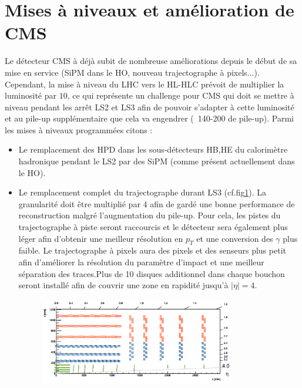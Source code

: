 \section{Mises à niveaux et amélioration de CMS}
Le détecteur CMS à déjà subit de nombreuse améliorations depuis le début de sa mise en service (SiPM dans le HO, nouveau trajectographe à pixels...). Cependant, la mise à niveau du LHC vers le HL-HLC prévoit de multiplier la luminosité par $10$, ce qui représente un challenge pour CMS qui doit se mettre à niveau pendant les arrêt LS2 et LS3 afin de pouvoir s'adapter à cette luminosité et au pile-up supplémentaire que cela va engendrer (~140-200 de pile-up). Parmi les mises à niveaux programmées citons \cite{Collaboration:1355706} \cite{Contardo:2020886} :
\begin{itemize}[label=$\bullet$]
	\item Le remplacement des HPD dans les sous-détecteurs HB,HE du calorimètre hadronique pendant le LS2 par des SiPM (comme présent actuellement dans le HO).
	\item Le remplacement complet du trajectographe durant LS3 (cf.fig\ref{tracker2}). La granularité doit être multiplié par 4 afin de gardé une bonne performance de reconstruction malgré l'augmentation du pile-up. Pour cela, les pistes du trajectographe à piste seront raccourcis et le détecteur sera également plus léger afin d'obtenir une meilleur résolution en $p_{T}$ et une conversion des $\gamma$ plus faible. Le trajectographe à pixels aura des pixels et des senseurs plus petit afin d'améliorer la résolution du paramètre d'impact et une meilleur séparation des traces.Plus de 10 disques additionnel dans chaque bouchon seront installé afin de couvrir une zone en rapidité jusqu'à $|\eta|=4$.
	\begin{figure}[ht!]
		\centering
		\includegraphics[width=0.80\textwidth]{CMS/tracker2.png}
		\label{tracker2}
	\end{figure}

\end{itemize}
